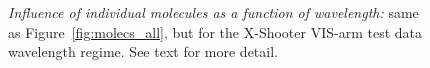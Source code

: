 \begin{appendix}
\begin{figure}[ht]
\begin{center}
    \label{fig:molecs_visir4}
  \end{center}
\end{figure}
\begin{figure}[ht]
  \begin{center}
    \caption{{\it Influence of individual molecules as a function of
    wavelength:} same as Figure~\ref{fig:molecs_all}, but for the X-Shooter
    VIS-arm test data wavelength regime. See text for more detail.}
    \label{fig:molecs_xshoo}
  \end{center}
\end{figure}
\end{appendix}
